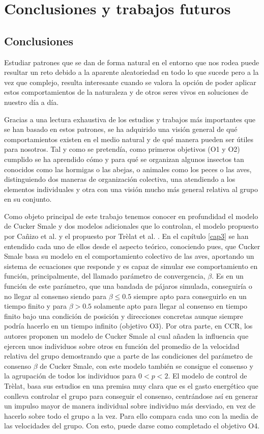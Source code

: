 \chapter{Conclusiones y trabajos futuros} \label{ch:conclusiones}

\section{Conclusiones} \label{s5_1}
Estudiar patrones que se dan de forma natural en el entorno que nos rodea puede resultar un reto debido a la aparente aleatoriedad en todo lo que sucede pero a la vez que complejo, resulta interesante cuando se valora la opción de poder aplicar estos comportamientos de la naturaleza y de otros seres vivos en soluciones de nuestro día a día.

Gracias a una lectura exhaustiva de los estudios y trabajos más importantes que se han basado en estos patrones, se ha adquirido una visión general de qué comportamientos existen en el medio natural y de qué manera pueden ser útiles para nosotros. Tal y como se pretendía, como primeros objetivos (O1 y O2) cumplido se ha aprendido cómo y para qué se organizan algunos insectos tan conocidos como las hormigas o las abejas, o animales como los peces o las aves, distinguiendo dos maneras de organización colectiva, una atendiendo a los elementos individuales y otra con una visión mucho más general relativa al grupo en su conjunto. 

Como objeto principal de este trabajo tenemos conocer en profundidad el modelo de Cucker Smale y dos modelos adicionales que lo controlan, el modelo propuesto por Cañizo et al. \cite{canizo2010collective} y el propuesto por Trèlat et al. \cite{caponigro2015sparse}. En el capítulo \ref{cap3} se han entendido cada uno de ellos desde el aspecto teórico, conociendo pues, que Cucker Smale basa su modelo en el comportamiento colectivo de las aves, aportando un sistema de ecuaciones que responde y es capaz de simular ese comportamiento en función, principalmente, del llamado parámetro de convergencia, $\beta$. Es en un función de este parámetro, que una bandada de pájaros simulada, conseguiría o no llegar al consenso siendo para $\beta\leq0.5$ siempre apto para conseguirlo en un tiempo finito y para $\beta>0.5$ solamente apto para llegar al consenso en tiempo finito bajo una condición de posición y direcciones concretas aunque siempre podría hacerlo en un tiempo infinito (objetivo O3). Por otra parte, en CCR, los autores proponen un modelo de Cucker Smale al cual añaden la influencia que ejercen unos individuos sobre otros en función del promedio de la velocidad relativa del grupo demostrando que a parte de las condiciones del parámetro de consenso $\beta$ de Cucker Smale, con este modelo también se consigue el consenso y la agrupación de todos los individuos para $0<p<2$. El modelo de control de Trèlat, basa sus estudios en una premisa muy clara que es el gasto energético que conlleva controlar el grupo para conseguir el consenso, centrándose así en generar un impulso mayor de manera individual sobre individuo más desviado, en vez de hacerlo sobre todo el grupo a la vez. Para ello compara cada uno con la media de las velocidades del grupo. Con esto, puede darse como completado el objetivo O4.

